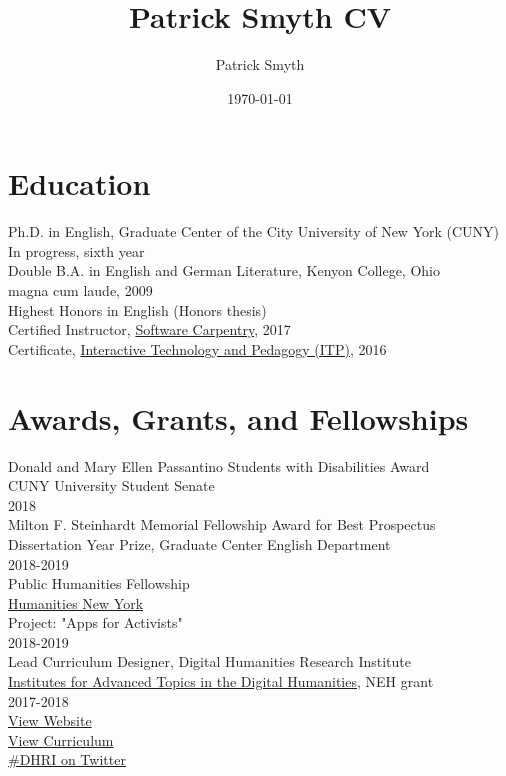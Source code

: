 \documentclass[11pt]{article}
\author{Patrick Smyth}
\date{\today}
\title{Patrick Smyth CV}
\begin{document}
\maketitle
\section*{Education}
\label{sec:orgheadline1}
Ph.D. in English, Graduate Center of the City University of New York (CUNY)\\
        In progress, sixth year\\

Double B.A. in English and German Literature, Kenyon College, Ohio\\
        magna cum laude, 2009\\
        Highest Honors in English (Honors thesis)\\

Certified Instructor, \href{https://software-carpentry.org/about/}{Software Carpentry}, 2017\\

Certificate, \href{https://www.gc.cuny.edu/Page-Elements/Academics-Research-Centers-Initiatives/Certificate-Programs/Interactive-Technology-and-Pedagogy}{Interactive Technology and Pedagogy (ITP)}, 2016\\

\section*{Awards, Grants, and Fellowships}
\label{sec:orgheadline2}
Donald and Mary Ellen Passantino Students with Disabilities Award\\
CUNY University Student Senate\\
2018\\

Milton F. Steinhardt Memorial Fellowship Award for Best Prospectus\\
Dissertation Year Prize, Graduate Center English Department\\
2018-2019\\

Public Humanities Fellowship\\
\href{https://humanitiesny.org/}{Humanities New York}\\
Project: "Apps for Activists"\\
2018-2019\\

Lead Curriculum Designer, Digital Humanities Research Institute\\
\href{https://www.neh.gov/grants/odh/institutes-advanced-topics-in-the-digital-humanities}{Institutes for Advanced Topics in the Digital Humanities}, NEH grant\\
2017-2018\\
\href{http://dhinstitutes.org}{View Website}\\
\href{https://github.com/DHRI-Curriculum}{View Curriculum}\\
\href{https://twitter.com/search?q=\%2523dhri&src=tyah}{\#DHRI on Twitter}\\
\end{document}
